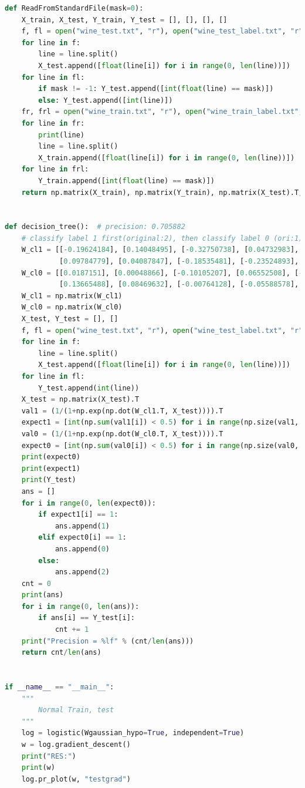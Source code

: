 \documentclass{article}
\begin{document}
\begin{lstlisting}[language={Python},title={hyperparams.py}]
def ReadFromStandardFile(mask=0):
    X_train, X_test, Y_train, Y_test = [], [], [], []
    f, fl = open("wine_test.txt", "r"), open("wine_test_label.txt", "r")
    for line in f:
        line = line.split()
        X_test.append([float(line[i]) for i in range(0, len(line))])
    for line in fl:
        if mask != -1: Y_test.append([int(float(line) == mask)])
        else: Y_test.append([int(line)])
    fr, frl = open("wine_train.txt", "r"), open("wine_train_label.txt", "r")
    for line in fr:
        print(line)
        line = line.split()
        X_train.append([float(line[i]) for i in range(0, len(line))])
    for line in frl:
        Y_train.append([int(float(line) == mask)])
    return np.matrix(X_train), np.matrix(Y_train), np.matrix(X_test).T, np.matrix(Y_test)


def decision_tree():  # precision: 0.705882
    # classify label 1 first(original:2), then classify label 0 (ori:1), the other point is label 2 (ori:3)
    W_cl1 = [[-0.19624184], [0.14048495], [-0.32750738], [0.04732983], [0.1123163], [0.02439485], [0.0467235],
             [0.09784779], [0.04087847], [-0.18535481], [-0.23524893], [-0.08212339], [-0.05971632], [-0.00696094]]
    W_cl0 = [[0.0187151], [0.00048866], [-0.10105207], [0.06552508], [-0.46800525], [-0.04441048], [-0.02615863],
             [0.13665488], [0.08469632], [-0.00764128], [-0.05588578], [-0.02218694], [0.03718035], [0.01629198]]
    W_cl1 = np.matrix(W_cl1)
    W_cl0 = np.matrix(W_cl0)
    X_test, Y_test = [], []
    f, fl = open("wine_test.txt", "r"), open("wine_test_label.txt", "r")
    for line in f:
        line = line.split()
        X_test.append([float(line[i]) for i in range(0, len(line))])
    for line in fl:
        Y_test.append(int(line))
    X_test = np.matrix(X_test).T
    val1 = (1/(1+np.exp(np.dot(W_cl1.T, X_test)))).T
    expect1 = [int(np.sum(val1[i]) < 0.5) for i in range(np.size(val1, 0))]
    val0 = (1/(1+np.exp(np.dot(W_cl0.T, X_test)))).T
    expect0 = [int(np.sum(val0[i]) < 0.5) for i in range(np.size(val0, 0))]
    print(expect0)
    print(expect1)
    print(Y_test)
    ans = []
    for i in range(0, len(expect0)):
        if expect1[i] == 1:
            ans.append(1)
        elif expect0[i] == 1:
            ans.append(0)
        else:
            ans.append(2)
    cnt = 0
    print(ans)
    for i in range(0, len(ans)):
        if ans[i] == Y_test[i]:
            cnt += 1
    print("Precision = %lf" % (cnt/len(ans)))
    return cnt/len(ans)


if __name__ == "__main__":
    """
        Normal Train, test
    """
    log = logistic(Wgaussian_hypo=True, independent=True)
    w = log.gradient_descent()
    print("RES:")
    print(w)
    log.pr_plot(w, "testgrad")


\end{lstlisting}
\end{document}
